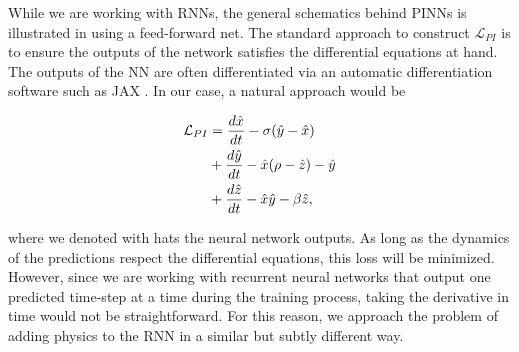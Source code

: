 While we are working with RNNs, the general schematics behind PINNs is illustrated in  using a feed-forward net. The standard approach to construct $\mathcal{L}_{PI}$ is to ensure the outputs of the network satisfies the differential equations at hand. The outputs of the NN are often differentiated via an automatic differentiation software such as JAX \cite{jax2018github}. In our case, a natural approach would be

\begin{align}
    \mathcal{L}_{PI} &=     \frac{d \hat{x}}{dt} - \sigma (\hat{y}-\hat{x}) \notag\\
    & + \frac{d\hat{y}}{dt} - \hat{x}(\rho -\hat{z}) - \hat{y} \notag\\
    & +\frac{d\hat{z}}{dt} - \hat{x}\hat{y}- \beta \hat{z},
\end{align}

where we denoted with hats the neural network outputs. As long as the dynamics of the predictions respect the differential equations, this loss will be minimized. However, since we are working with recurrent neural networks that output one predicted time-step at a time during the training process, taking the derivative in time would not be straightforward. For this reason, we approach the problem of adding physics to the RNN in a similar but subtly different way. 

